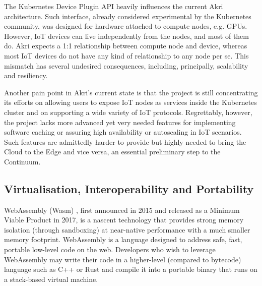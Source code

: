 The Kubernetes Device Plugin API heavily influences the current Akri architecture. Such interface, already considered experimental by the Kubernetes community, was designed for hardware attached to compute nodes, e.g. GPUs. However, IoT devices can live independently from the nodes, and most of them do. Akri expects a 1:1 relationship between compute node and device, whereas most IoT devices do not have any kind of relationship to any node per se. This mismatch has several undesired consequences, including, principally, scalability and resiliency.

Another pain point in Akri's current state is that the project is still concentrating its efforts on allowing users to expose IoT nodes as services inside the Kubernetes cluster and on supporting a wide variety of IoT protocols. Regrettably, however, the project lacks more advanced yet very needed features for implementing software caching or assuring high availability or autoscaling in IoT scenarios. Such features are admittedly harder to provide but highly needed to bring the Cloud to the Edge and vice versa, an essential preliminary step to the Continuum.

\subsection{Virtualisation, Interoperability and Portability}\label{sec:virtualization}


WebAssembly (Wasm) \cite{haas2017bringing}, first announced in 2015 and released as a Minimum Viable Product in 2017, is a nascent technology that provides strong memory isolation (through sandboxing) at near-native performance with a much smaller memory footprint. WebAssembly is a language designed to address safe, fast, portable low-level code on the web. Developers who wish to leverage WebAssembly may write their code in a higher-level (compared to bytecode) language such as C++ or Rust and compile it into a portable binary that runs on a stack-based virtual machine.


